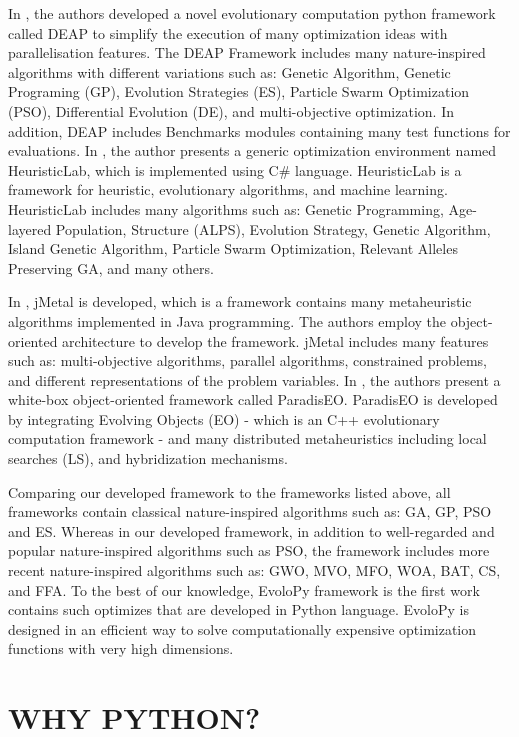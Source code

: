 \documentclass[a4paper,twoside]{article}
\begin{document}
In \cite {DEAP_JMLR2012}, the authors developed a novel evolutionary computation python framework called DEAP to simplify the execution of many optimization ideas with  parallelisation features. The DEAP Framework includes many nature-inspired algorithms with different variations such as: Genetic Algorithm, Genetic Programing (GP), Evolution Strategies (ES), Particle Swarm Optimization (PSO), Differential Evolution (DE), and multi-objective optimization. In addition, DEAP includes Benchmarks modules containing many test functions for evaluations. In \cite{Wagner04}, the author presents a generic optimization environment named HeuristicLab, which is implemented using C\# language. HeuristicLab is a framework for heuristic, evolutionary algorithms, and machine learning. HeuristicLab includes many algorithms such as: Genetic Programming, Age-layered Population, Structure (ALPS), Evolution Strategy, Genetic Algorithm, Island Genetic Algorithm, Particle Swarm Optimization, Relevant Alleles Preserving GA, and many others. 

In \cite{Durillo2011}, jMetal is developed, which is a framework contains many metaheuristic algorithms implemented in Java programming. The authors employ the object-oriented architecture to develop the framework. jMetal includes many features such as: multi-objective algorithms, parallel algorithms, constrained problems, and different representations of the problem variables. In \cite{Cahon2004,humeau13}, the authors present a white-box object-oriented framework called ParadisEO. ParadisEO is developed by integrating Evolving Objects (EO) - which is an C++ evolutionary computation framework - and many distributed metaheuristics including local searches (LS), and hybridization mechanisms.  

Comparing our developed framework to the frameworks listed above, all frameworks contain classical nature-inspired algorithms such as: GA, GP, PSO and ES. Whereas in our developed framework, in addition to well-regarded and popular nature-inspired algorithms such as PSO, the framework includes more recent nature-inspired algorithms such as: GWO, MVO, MFO, WOA, BAT, CS, and FFA. To the best of our knowledge, EvoloPy framework is the first work contains such optimizes that are developed in Python language. EvoloPy is designed in an efficient way to solve computationally expensive optimization functions with very high dimensions.


\section{\uppercase{Why Python?}}
\end{document}
